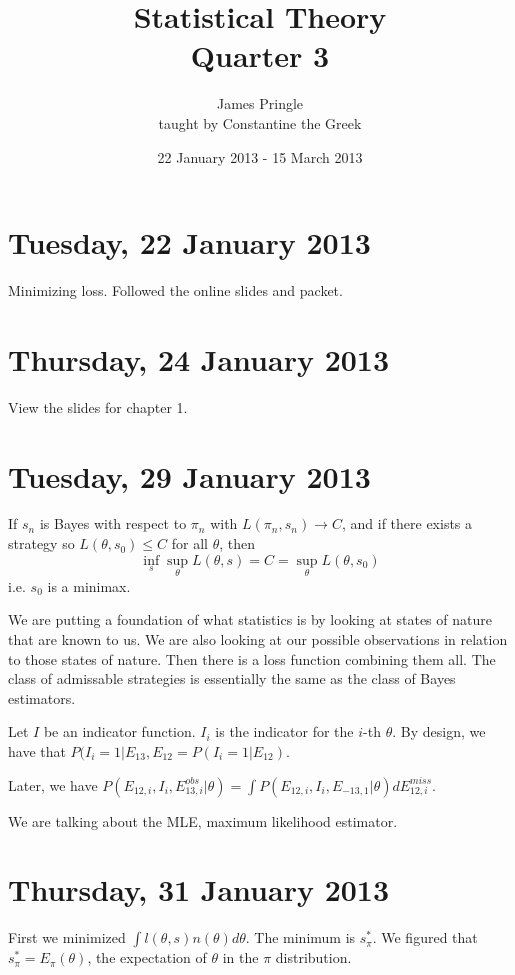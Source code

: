 \documentclass[letterpaper, 12pt]{article}
\theoremstyle{definition}
\theoremstyle{plain}
\begin{document}
\title{Statistical Theory \\ 
		 Quarter 3}
\author{James Pringle \\
			 taught by Constantine the Greek}
\date{22 January 2013 - 15 March 2013}
\maketitle

\section{Tuesday, 22 January 2013}
Minimizing loss. Followed the online slides and packet.

\section{Thursday, 24 January 2013}
View the slides for chapter 1.

\section{Tuesday, 29 January 2013}
If $s_n$ is Bayes with respect to $\pi_n$ with $L(\pi_n, s_n) \rightarrow C$, and if there exists a strategy so $L(\theta, s_0) \leq C$ for all $\theta$, then 
\[
\inf_s \sup_\theta L(\theta, s) = C = \sup_\theta L(\theta, s_0)
\]
i.e. $s_0$ is a minimax.

We are putting a foundation of what statistics is by looking at states of nature that are known to us. We are also looking at our possible observations in relation to those states of nature. Then there is a loss function combining them all. The class of admissable strategies is essentially the same as the class of Bayes estimators.

Let $I$ be an indicator function. $I_i$ is the indicator for the $i$-th $\theta$. By design, we have that $P(I_i = 1 | E_{13}, E_{12} = P(I_i = 1 | E_{12})$.

Later, we have $P(E_{12,i}, I_i, E_{13,i}^{obs} | \theta) = \int P(E_{12,i}, I_i, E_{-13, 1} | \theta) d E_{12,i}^{miss}$.

We are talking about the MLE, maximum likelihood estimator.

\section{Thursday, 31 January 2013}
First we minimized $\int l(\theta, s) n(\theta) d \theta$. The minimum is $s^*_\pi$. We figured that $s^*_\pi = E_\pi(\theta)$, the expectation of $\theta$ in the $\pi$ distribution.
\end{document}

